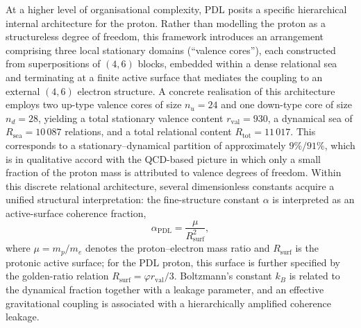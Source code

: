 \documentclass[11pt,a4paper]{article}
\begin{document}
At a higher level of organisational complexity, PDL posits a specific hierarchical internal architecture for the proton. Rather than modelling the proton as a structureless degree of freedom, this framework introduces an arrangement comprising three local stationary domains (“valence cores”), each constructed from superpositions of $(4,6)$ blocks, embedded within a dense relational sea and terminating at a finite active surface that mediates the coupling to an external $(4,6)$ electron structure.\cite{LaubscherIntroPDL2026,LaubscherPDLFull2026,LaubscherLDP2026} A concrete realisation of this architecture employs two up-type valence cores of size $n_u=24$ and one down-type core of size $n_d=28$, yielding a total stationary valence content $r_{\mathrm{val}}=930$, a dynamical sea of $R_{\mathrm{sea}}=10\,087$ relations, and a total relational content $R_{\mathrm{tot}}=11\,017$.\cite{LaubscherIntroPDL2026,LaubscherPDLFull2026} This corresponds to a stationary–dynamical partition of approximately $9\%/91\%$, which is in qualitative accord with the QCD-based picture in which only a small fraction of the proton mass is attributed to valence degrees of freedom.\cite{LaubscherIMRadPDL2026,AmslerQCDProton} Within this discrete relational architecture, several dimensionless constants acquire a unified structural interpretation: the fine-structure constant $\alpha$ is interpreted as an active-surface coherence fraction, \[ \alpha_{\mathrm{PDL}} = \frac{\mu}{R_{\mathrm{surf}}^{2}}, \] where $\mu = m_p/m_e$ denotes the proton–electron mass ratio and $R_{\mathrm{surf}}$ is the protonic active surface; for the PDL proton, this surface is further specified by the golden-ratio relation $R_{\mathrm{surf}} = \varphi r_{\mathrm{val}}/3$.\cite{LaubscherDerivationAlpha2026} Boltzmann’s constant $k_B$ is related to the dynamical fraction together with a leakage parameter, and an effective gravitational coupling is associated with a hierarchically amplified coherence leakage.\cite{LaubscherPDLFull2026,LaubscherLDP2026,LaubscherIMRadPDL2026,LaubscherExponent18PDL2026} 
\end{document}
